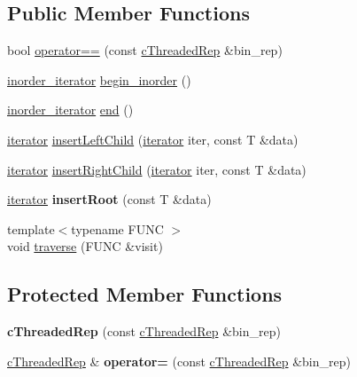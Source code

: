 \subsection*{\-Public \-Member \-Functions}
\begin{DoxyCompactItemize}
\item 
bool \hyperlink{classtree_1_1cThreadedRep_a462ebaa3cc1325d075bf8ac280f65a9b}{operator==} (const \hyperlink{classtree_1_1cThreadedRep}{c\-Threaded\-Rep} \&bin\-\_\-rep)
\item 
\hyperlink{classtree_1_1btree__inorder__iterator}{inorder\-\_\-iterator} \hyperlink{classtree_1_1cThreadedRep_aecd82c23c72edb946467838b46d37f86}{begin\-\_\-inorder} ()
\item 
\hyperlink{classtree_1_1btree__inorder__iterator}{inorder\-\_\-iterator} \hyperlink{classtree_1_1cThreadedRep_a8c420c636dc2ec5385edc6e514d739ff}{end} ()
\item 
\hyperlink{classtree_1_1btree__iterator}{iterator} \hyperlink{classtree_1_1cThreadedRep_ae4ba780c69109062000b5bad7b382e15}{insert\-Left\-Child} (\hyperlink{classtree_1_1btree__iterator}{iterator} iter, const \-T \&data)
\item 
\hyperlink{classtree_1_1btree__iterator}{iterator} \hyperlink{classtree_1_1cThreadedRep_af2e67bf601d8d1d55b83c05d1162b7e2}{insert\-Right\-Child} (\hyperlink{classtree_1_1btree__iterator}{iterator} iter, const \-T \&data)
\item 
\hypertarget{classtree_1_1cThreadedRep_aa41d7c0738b86fa1efcd5c0a9d5bc2a1}{\hyperlink{classtree_1_1btree__iterator}{iterator} {\bfseries insert\-Root} (const \-T \&data)}\label{classtree_1_1cThreadedRep_aa41d7c0738b86fa1efcd5c0a9d5bc2a1}

\item 
{\footnotesize template$<$typename F\-U\-N\-C $>$ }\\void \hyperlink{classtree_1_1cThreadedRep_a93489947fed29ed25fbb7268cbae049d}{traverse} (\-F\-U\-N\-C \&visit)
\end{DoxyCompactItemize}
\subsection*{\-Protected \-Member \-Functions}
\begin{DoxyCompactItemize}
\item 
\hypertarget{classtree_1_1cThreadedRep_a0b6f3dbf4b6f24795563bed2fea6a7e5}{{\bfseries c\-Threaded\-Rep} (const \hyperlink{classtree_1_1cThreadedRep}{c\-Threaded\-Rep} \&bin\-\_\-rep)}\label{classtree_1_1cThreadedRep_a0b6f3dbf4b6f24795563bed2fea6a7e5}

\item 
\hypertarget{classtree_1_1cThreadedRep_ad872e3bf5a20f7b7ce0e0148edf682cf}{\hyperlink{classtree_1_1cThreadedRep}{c\-Threaded\-Rep} \& {\bfseries operator=} (const \hyperlink{classtree_1_1cThreadedRep}{c\-Threaded\-Rep} \&bin\-\_\-rep)}\label{classtree_1_1cThreadedRep_ad872e3bf5a20f7b7ce0e0148edf682cf}

\end{DoxyCompactItemize}

